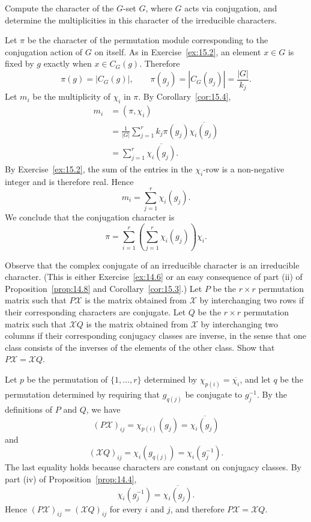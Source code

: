 \documentclass[../Odyssey_Project.tex]{subfiles}
\begin{document}
\begin{exercise}
\label{ex:15.3}
Compute the character of the $G$-set $G$, where $G$ acts via conjugation, and determine the multiplicities in this character of the irreducible characters.
\end{exercise}
\begin{solution}
    Let $\pi$ be the character of the permutation module corresponding to the conjugation action of $G$ on itself. As in Exercise~\ref{ex:15.2}, an element $x\in G$ is fixed by $g$ exactly when $x\in C_G(g)$. Therefore
    \[
        \pi(g)=|C_G(g)|,
        \qquad
        \pi(g_j)=|C_G(g_j)|=\frac{|G|}{k_j}.
    \]
    Let $m_i$ be the multiplicity of $\chi_i$ in $\pi$. By Corollary~\ref{cor:15.4},
    \begin{align*}
        m_i
        &=(\pi,\chi_i) \\
        &=\frac{1}{|G|}\sum_{j=1}^{r}k_j\pi(g_j)\overline{\chi_i(g_j)} \\
        &=\sum_{j=1}^{r}\overline{\chi_i(g_j)}.
    \end{align*}
    By Exercise~\ref{ex:15.2}, the sum of the entries in the $\chi_i$-row is a non-negative integer and is therefore real. Hence
    \[
        m_i=\sum_{j=1}^{r}\chi_i(g_j).
    \]
    We conclude that the conjugation character is
    \[
        \pi
        =
        \sum_{i=1}^{r}\left(\sum_{j=1}^{r}\chi_i(g_j)\right)\chi_i.
    \]
\end{solution}

\begin{exercise}
\label{ex:15.4}
Observe that the complex conjugate of an irreducible character is an irreducible character. (This is either Exercise~\ref{ex:14.6} or an easy consequence of part (ii) of Proposition~\ref{prop:14.8} and Corollary~\ref{cor:15.3}.) Let $P$ be the $r \times r$ permutation matrix such that $P\mathcal{X}$ is the matrix obtained from $\mathcal{X}$ by interchanging two rows if their corresponding characters are conjugate. Let $Q$ be the $r \times r$ permutation matrix such that $\mathcal{X}Q$ is the matrix obtained from $\mathcal{X}$ by interchanging two columns if their corresponding conjugacy classes are inverse, in the sense that one class consists of the inverses of the elements of the other class. Show that $P\mathcal{X} = \mathcal{X}Q$.
\end{exercise}
\begin{solution}
    Let $p$ be the permutation of $\{1,\ldots,r\}$ determined by $\chi_{p(i)}=\overline{\chi_i}$, and let $q$ be the permutation determined by requiring that $g_{q(j)}$ be conjugate to $g_j^{-1}$. By the definitions of $P$ and $Q$, we have
    \[
        (P\mathcal{X})_{ij}
        =
        \chi_{p(i)}(g_j)
        =
        \overline{\chi_i(g_j)}
    \]
    and
    \[
        (\mathcal{X}Q)_{ij}
        =
        \chi_i(g_{q(j)})
        =
        \chi_i(g_j^{-1}).
    \]
    The last equality holds because characters are constant on conjugacy classes. By part (iv) of Proposition~\ref{prop:14.4},
    \[
        \chi_i(g_j^{-1})=\overline{\chi_i(g_j)}.
    \]
    Hence $(P\mathcal{X})_{ij}=(\mathcal{X}Q)_{ij}$ for every $i$ and $j$, and therefore $P\mathcal{X}=\mathcal{X}Q$.
\end{solution}
\end{document}
